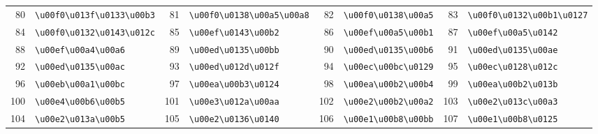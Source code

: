 \begin{table}[!htbp]
\begin{tabular}{r l r l r l r l}
80 & \texttt{\textbackslash{}u00f0\textbackslash{}u013f\textbackslash{}u0133\textbackslash{}u00b3} & 81 & \texttt{\textbackslash{}u00f0\textbackslash{}u0138\textbackslash{}u00a5\textbackslash{}u00a8} & 82 & \texttt{\textbackslash{}u00f0\textbackslash{}u0138\textbackslash{}u00a5} & 83 & \texttt{\textbackslash{}u00f0\textbackslash{}u0132\textbackslash{}u00b1\textbackslash{}u0127} \\
84 & \texttt{\textbackslash{}u00f0\textbackslash{}u0132\textbackslash{}u0143\textbackslash{}u012c} & 85 & \texttt{\textbackslash{}u00ef\textbackslash{}u0143\textbackslash{}u00b2} & 86 & \texttt{\textbackslash{}u00ef\textbackslash{}u00a5\textbackslash{}u00b1} & 87 & \texttt{\textbackslash{}u00ef\textbackslash{}u00a5\textbackslash{}u0142} \\
88 & \texttt{\textbackslash{}u00ef\textbackslash{}u00a4\textbackslash{}u00a6} & 89 & \texttt{\textbackslash{}u00ed\textbackslash{}u0135\textbackslash{}u00bb} & 90 & \texttt{\textbackslash{}u00ed\textbackslash{}u0135\textbackslash{}u00b6} & 91 & \texttt{\textbackslash{}u00ed\textbackslash{}u0135\textbackslash{}u00ae} \\
92 & \texttt{\textbackslash{}u00ed\textbackslash{}u0135\textbackslash{}u00ac} & 93 & \texttt{\textbackslash{}u00ed\textbackslash{}u012d\textbackslash{}u012f} & 94 & \texttt{\textbackslash{}u00ec\textbackslash{}u00bc\textbackslash{}u0129} & 95 & \texttt{\textbackslash{}u00ec\textbackslash{}u0128\textbackslash{}u012c} \\
96 & \texttt{\textbackslash{}u00eb\textbackslash{}u00a1\textbackslash{}u00bc} & 97 & \texttt{\textbackslash{}u00ea\textbackslash{}u00b3\textbackslash{}u0124} & 98 & \texttt{\textbackslash{}u00ea\textbackslash{}u00b2\textbackslash{}u00b4} & 99 & \texttt{\textbackslash{}u00ea\textbackslash{}u00b2\textbackslash{}u013b} \\
100 & \texttt{\textbackslash{}u00e4\textbackslash{}u00b6\textbackslash{}u00b5} & 101 & \texttt{\textbackslash{}u00e3\textbackslash{}u012a\textbackslash{}u00aa} & 102 & \texttt{\textbackslash{}u00e2\textbackslash{}u00b2\textbackslash{}u00a2} & 103 & \texttt{\textbackslash{}u00e2\textbackslash{}u013c\textbackslash{}u00a3} \\
104 & \texttt{\textbackslash{}u00e2\textbackslash{}u013a\textbackslash{}u00b5} & 105 & \texttt{\textbackslash{}u00e2\textbackslash{}u0136\textbackslash{}u0140} & 106 & \texttt{\textbackslash{}u00e1\textbackslash{}u00b8\textbackslash{}u00bb} & 107 & \texttt{\textbackslash{}u00e1\textbackslash{}u00b8\textbackslash{}u0125} \\

\end{tabular}
\end{table}
